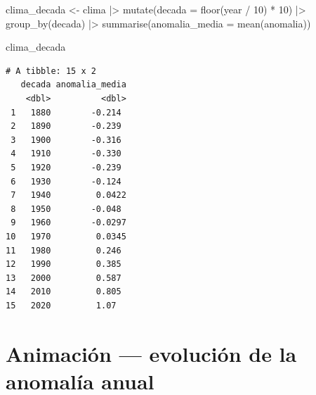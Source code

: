\documentclass[
  letterpaper,
  DIV=11,
  numbers=noendperiod]{scrreprt}
\newenvironment{Shaded}{\begin{snugshade}}{\end{snugshade}}
\newcommand{\AttributeTok}[1]{\textcolor[rgb]{0.40,0.45,0.13}{#1}}
\newcommand{\DecValTok}[1]{\textcolor[rgb]{0.68,0.00,0.00}{#1}}
\newcommand{\FunctionTok}[1]{\textcolor[rgb]{0.28,0.35,0.67}{#1}}
\newcommand{\NormalTok}[1]{\textcolor[rgb]{0.00,0.23,0.31}{#1}}
\newcommand{\OtherTok}[1]{\textcolor[rgb]{0.00,0.23,0.31}{#1}}
\newcommand{\SpecialCharTok}[1]{\textcolor[rgb]{0.37,0.37,0.37}{#1}}
\begin{document}
\begin{Shaded}
\begin{Highlighting}[]
\NormalTok{clima\_decada }\OtherTok{\textless{}{-}}\NormalTok{ clima }\SpecialCharTok{|\textgreater{}}
  \FunctionTok{mutate}\NormalTok{(}\AttributeTok{decada =} \FunctionTok{floor}\NormalTok{(year }\SpecialCharTok{/} \DecValTok{10}\NormalTok{) }\SpecialCharTok{*} \DecValTok{10}\NormalTok{) }\SpecialCharTok{|\textgreater{}}
  \FunctionTok{group\_by}\NormalTok{(decada) }\SpecialCharTok{|\textgreater{}}
  \FunctionTok{summarise}\NormalTok{(}\AttributeTok{anomalia\_media =} \FunctionTok{mean}\NormalTok{(anomalia))}

\NormalTok{clima\_decada}
\end{Highlighting}
\end{Shaded}

\begin{verbatim}
# A tibble: 15 x 2
   decada anomalia_media
    <dbl>          <dbl>
 1   1880        -0.214 
 2   1890        -0.239 
 3   1900        -0.316 
 4   1910        -0.330 
 5   1920        -0.239 
 6   1930        -0.124 
 7   1940         0.0422
 8   1950        -0.048 
 9   1960        -0.0297
10   1970         0.0345
11   1980         0.246 
12   1990         0.385 
13   2000         0.587 
14   2010         0.805 
15   2020         1.07  
\end{verbatim}

\section{Animación --- evolución de la anomalía
anual}\label{animaciuxf3n-evoluciuxf3n-de-la-anomaluxeda-anual}
\end{document}
